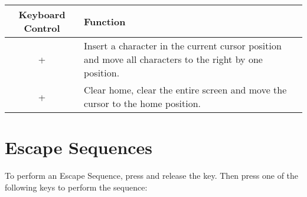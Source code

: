 \begin{center}
\begin{longtable}{c|L{5.5cm}}
	\textbf{Keyboard Control} & \textbf{Function}\\
   \hline
	\endhead

 +  &
Insert a character in the current cursor position and move all characters to the right by one position.\\

 +  &
Clear home, clear the entire screen and move the cursor to the home position.\\


\end{longtable}
\end{center}


\newpage



\section{Escape Sequences}
\label{appendix:escapesequences}

To perform an Escape Sequence, press and release the  key. Then press one of the following keys to perform the sequence:


